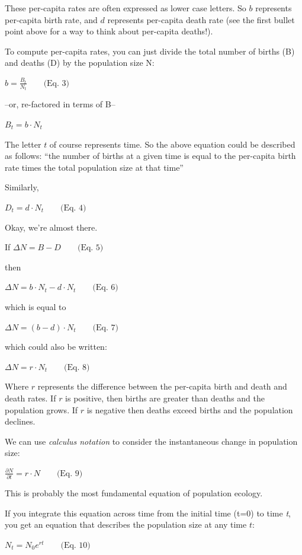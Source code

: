 \documentclass[
]{article}
\begin{document}
These per-capita rates are often expressed as lower case letters. So
\(b\) represents per-capita birth rate, and \(d\) represents per-capita
death rate (see the first bullet point above for a way to think about
per-capita deaths!).

To compute per-capita rates, you can just divide the total number of
births (B) and deaths (D) by the population size N:

\(b = \frac {B_t}{N_t} \qquad \text{(Eq. 3)}\)

--or, re-factored in terms of B--

\(B_t = b \cdot N_t\)

The letter \(t\) of course represents time. So the above equation could
be described as follows: ``the number of births at a given time is equal
to the per-capita birth rate times the total population size at that
time''

Similarly,

\(D_t = d \cdot N_t \qquad \text{(Eq. 4)}\)

Okay, we're almost there.

If \(\Delta N = B - D \qquad \text{(Eq. 5)}\)

then

\(\Delta N = b \cdot N_t - d \cdot N_t\qquad \text{(Eq. 6)}\)

which is equal to

\(\Delta N = (b - d) \cdot N_t \qquad \text{(Eq. 7)}\)

which could also be written:

\(\Delta N = r \cdot N_t\qquad \text{(Eq. 8)}\)

Where \(r\) represents the difference between the per-capita birth and
death and death rates. If \(r\) is positive, then births are greater
than deaths and the population grows. If \(r\) is negative then deaths
exceed births and the population declines.

We can use \emph{calculus notation} to consider the instantaneous change
in population size:

\(\frac{\partial N}{\partial t} = r \cdot N \qquad \text{(Eq. 9)}\)

This is probably the most fundamental equation of population ecology.

If you integrate this equation across time from the initial time (t=0)
to time \emph{t}, you get an equation that describes the population size
at any time \(t\):

\(N_t = N_0 e^{rt} \qquad \text{(Eq. 10)}\)
\end{document}
